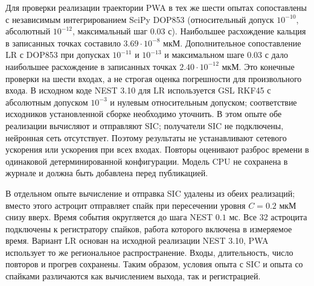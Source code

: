 Для проверки реализации траектории PWA в тех же шести опытах сопоставлены с независимым интегрированием SciPy DOP853 (относительный допуск $10^{-10}$, абсолютный $10^{-12}$, максимальный шаг $0.03$ с). Наибольшее расхождение кальция в записанных точках составило $3.69\cdot10^{-8}$ мкМ. Дополнительное сопоставление LR с DOP853 при допусках $10^{-11}$ и $10^{-13}$ и максимальном шаге $0.03$ с дало наибольшее расхождение в записанных точках $2.40\cdot10^{-12}$ мкМ. Это конечные проверки на шести входах, а не строгая оценка погрешности для произвольного входа. В исходном коде NEST 3.10 для LR используется GSL RKF45 с абсолютным допуском $10^{-3}$ и нулевым относительным допуском; соответствие исходников установленной сборке необходимо уточнить. В этом опыте обе реализации вычисляют и отправляют SIC; получатели SIC не подключены, нейронная сеть отсутствует. Поэтому результаты не устанавливают сетевого ускорения или ускорения при всех входах. Повторы оценивают разброс времени в одинаковой детерминированной конфигурации. Модель CPU не сохранена в журнале и должна быть добавлена перед публикацией.

В отдельном опыте вычисление и отправка SIC удалены из обеих реализаций; вместо этого астроцит отправляет спайк при пересечении уровня $C=0.2$ мкМ снизу вверх. Время события округляется до шага NEST $0.1$ мс. Все 32 астроцита подключены к регистратору спайков, работа которого включена в измеряемое время. Вариант LR основан на исходной реализации NEST 3.10, PWA использует то же региональное распространение. Входы, длительность, число повторов и прогрев сохранены. Таким образом, условия опыта с SIC и опыта со спайками различаются как вычислением выхода, так и регистрацией.

